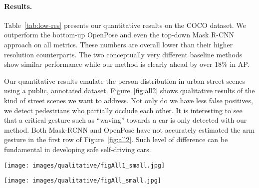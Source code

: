 \documentclass[10pt,twocolumn,letterpaper]{article}
\begin{document}
\paragraph{Results.}
Table~\ref{tab:low-res} presents our quantitative results on the COCO dataset. We
outperform the bottom-up OpenPose and even the top-down Mask R-CNN approach on all
metrics. These numbers are overall lower than their higher resolution counterparts. The
two conceptually very different baseline methods show similar performance while our method
is clearly ahead by over 18\% in AP.

Our quantitative results emulate the person distribution in urban street scenes
using a public, annotated dataset. Figure~\ref{fig:all2} shows
qualitative results of the kind of street scenes we want to address. Not only do we have
less false positives, we detect pedestrians who partially occlude each other. It is
interesting to see that a critical gesture such as ``waving'' towards a car is only
detected with our method. Both Mask-RCNN and OpenPose have not accurately estimated the
arm gesture in the first row of Figure~\ref{fig:all2}. Such level of difference can be
fundamental in developing safe self-driving cars.

\begin{figure*}
  \centering
  \texttt{[image: images/qualitative/figAll1\_small.jpg]}
  \caption{Illustration of our PifPaf method (right hand-side) against OpenPose~\cite{partsaffinityfields} (first column) and Mask R-CNN~\cite{tseng2018detectron} (second column) on the \textit{nuScenes} dataset. We highlight with bounding boxes all humans that other methods did not detect, and with circles all false positives. Note that our method correctly estimates the waving pose (first row, first bounding box) of a person whereas the others fail to do so.}
  \label{fig:all2}
\end{figure*}

\begin{figure*}
  \centering
  \texttt{[image: images/qualitative/figAll\_small.jpg]}
  \caption{Illustration of our PifPaf method (right hand-side) against Mask R-CNN~\cite{tseng2018detectron} (left hand-side). We highlight with bounding boxes all humans where Mask R-CNN misses their poses with respect to our method. Our method estimates all poses that Mask R-CNN estimates as well as the ones highlighted with bounding boxes.}
  \label{fig:all}
\end{figure*}
\end{document}
